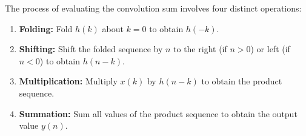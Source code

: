 The process of evaluating the convolution sum involves four distinct
operations:

\begin{enumerate}
\def\labelenumi{\arabic{enumi}.}
\tightlist
\item
  \textbf{Folding:} Fold \(h(k)\) about \(k=0\) to obtain \(h(-k)\).
\item
  \textbf{Shifting:} Shift the folded sequence by \(n\) to the right (if
  \(n>0\)) or left (if \(n<0\)) to obtain \(h(n-k)\).
\item
  \textbf{Multiplication:} Multiply \(x(k)\) by \(h(n-k)\) to obtain the
  product sequence.
\item
  \textbf{Summation:} Sum all values of the product sequence to obtain
  the output value \(y(n)\).
\end{enumerate}

